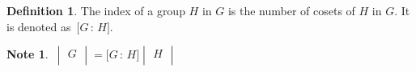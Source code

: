 \documentclass[11pt,a4paper]{article}
\theoremstyle{definition}
\newtheorem{defn}[thm]{Definition}
\newtheorem*{note}{Note}
\begin{document}
\begin{defn}
The index of a group $H$ in $G$ is the number of cosets of $H$ in $G$. It is denoted as $\, \big[G\, :\, H\big]$.\\


\begin{note}
$\, \begin{vmatrix}
G\\
\end{vmatrix}  = \big[G\, :\, H\big]\begin{vmatrix}
H\\
\end{vmatrix}$\\\\
\end{note}
\end{defn}
\end{document}

